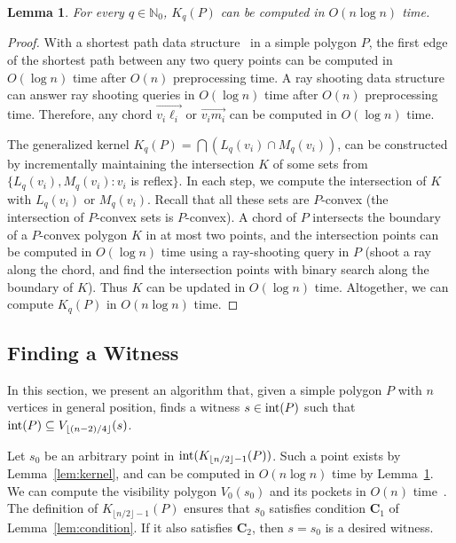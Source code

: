 \documentclass[12pt]{article}
\newcommand{\floor}[1]{{\lfloor #1 \rfloor}}
\newtheorem{lemma}{Lemma}
\begin{document}
\begin{lemma}\label{lem:kernel2}
For every $q\in \mathbb{N}_0$, $K_q(P)$ can be computed in $O(n\log n)$ time.
\end{lemma}

\begin{proof}
With a shortest path data structure~\cite{GH89} in a simple polygon $P$, the first edge of the shortest path
between any two query points can be computed in $O(\log n)$ time after $O(n)$ preprocessing time. A ray shooting data structure~\cite{HS95} can answer ray shooting queries in $O(\log n)$ time after $O(n)$ preprocessing time. Therefore, any chord $\overrightarrow{v_i\ell_i}$ or $\overrightarrow{v_im_i}$ can be computed in $O(\log n)$ time.

The generalized kernel $K_q(P) = \bigcap \left(L_q(v_i) \cap M_q(v_i) \right)$, can be constructed by incrementally maintaining the intersection $K$ of some sets from $\{L_q(v_i), M_q(v_i): v_i$ is reflex$\}$. In each step, we compute the intersection of $K$ with $L_q(v_i)$ or $M_q(v_i)$. Recall that all these sets are $P$-convex (the intersection of $P$-convex sets is $P$-convex). A chord of $P$ intersects the boundary of a $P$-convex polygon $K$ in at most two points, and the intersection points can be computed in $O(\log n)$ time using a ray-shooting query in $P$ (shoot a ray along the chord, and find the intersection points with binary search along the boundary of $K$). Thus $K$ can be updated in $O(\log n)$ time. Altogether, we can compute $K_q(P)$ in $O(n\log n)$ time.
\end{proof}


\subsection{Finding a Witness}
\label{ssec:witness}

In this section, we present an algorithm that, given a simple polygon $P$ with $n$ vertices in general position, finds a witness $s\in {\rm int}(P)$ such that ${\rm int}(P)\subseteq V_{\floor{(n-2)/4}}(s)$.

Let $s_0$ be an arbitrary point in ${\rm int}(K_{\floor{n/2}-1}(P))$. Such a point exists by Lemma~\ref{lem:kernel}, and can be computed in $O(n \log n)$ time by Lemma~\ref{lem:kernel2}. We can compute the visibility polygon $V_0(s_0)$
and its pockets in $O(n)$ time~\cite{GHL+87}. The definition of $K_{\floor{n/2}-1}(P)$ ensures that $s_0$ satisfies condition $\mathbf{C}_1$ of Lemma~\ref{lem:condition}. If it also satisfies $\mathbf{C}_2$, then $s=s_0$ is a desired witness.
\end{document}
